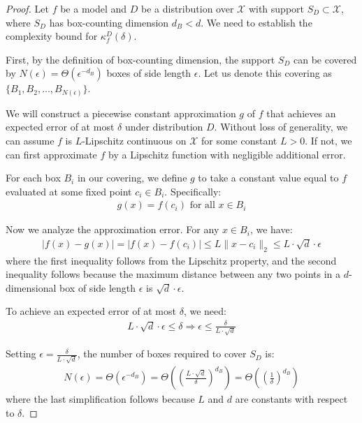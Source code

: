 \documentclass[11pt,letter,leqno]{article}
\begin{document}
\begin{proof}
Let $f$ be a model and $D$ be a distribution over $\mathcal{X}$ with support $S_D \subset \mathcal{X}$, where $S_D$ has box-counting dimension $d_B < d$.  We need to establish the complexity bound for $\kappa_f^D(\delta)$.

First, by the definition of box-counting dimension, the support $S_D$ can be covered by $N(\epsilon) = \Theta(\epsilon^{-d_B})$ boxes of side length $\epsilon$.  Let us denote this covering as $\{B_1, B_2, \ldots, B_{N(\epsilon)}\}$.

We will construct a piecewise constant approximation $g$ of $f$ that achieves an expected error of at most $\delta$ under distribution $D$.  Without loss of generality, we can assume $f$ is $L$-Lipschitz continuous on $\mathcal{X}$ for some constant $L > 0$.  If not, we can first approximate $f$ by a Lipschitz function with negligible additional error.

For each box $B_i$ in our covering, we define $g$ to take a constant value equal to $f$ evaluated at some fixed point $c_i \in B_i$.  Specifically:
\begin{align}
g(x) = f(c_i) \text{ for all } x \in B_i
\end{align}

Now we analyze the approximation error.  For any $x \in B_i$, we have:
\begin{align}
|f(x) - g(x)| = |f(x) - f(c_i)| \leq L \|x - c_i\|_2 \leq L \cdot \sqrt{d} \cdot \epsilon
\end{align}
where the first inequality follows from the Lipschitz property, and the second inequality follows because the maximum distance between any two points in a $d$-dimensional box of side length $\epsilon$ is $\sqrt{d} \cdot \epsilon$.

To achieve an expected error of at most $\delta$, we need:
\begin{align}
L \cdot \sqrt{d} \cdot \epsilon \leq \delta \Rightarrow \epsilon \leq \frac{\delta}{L \cdot \sqrt{d}}
\end{align}

Setting $\epsilon = \frac{\delta}{L \cdot \sqrt{d}}$, the number of boxes required to cover $S_D$ is:
\begin{align}
N(\epsilon) = \Theta(\epsilon^{-d_B}) = \Theta\left(\left(\frac{L \cdot \sqrt{d}}{\delta}\right)^{d_B}\right) = \Theta\left(\left(\frac{1}{\delta}\right)^{d_B}\right)
\end{align}
where the last simplification follows because $L$ and $d$ are constants with respect to $\delta$.


\end{proof}
\end{document}
